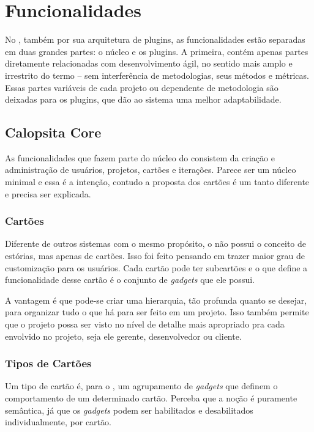 \section{Funcionalidades}

No \calopsita, também por sua arquitetura de plugins, as funcionalidades estão separadas em duas grandes partes: o núcleo e os plugins. A primeira, contém apenas partes diretamente relacionadas com desenvolvimento ágil, no sentido mais amplo e irrestrito do termo -- sem interferência de metodologias, seus métodos e métricas. Essas partes variáveis de cada projeto ou dependente de metodologia são deixadas para os plugins, que dão ao sistema uma melhor adaptabilidade.

\subsection{Calopsita Core}

As funcionalidades que fazem parte do núcleo do \calopsita consistem da criação e administração de usuários, projetos, cartões e iterações. Parece ser um núcleo minimal e essa é a intenção, contudo a proposta dos cartões é um tanto diferente e precisa ser explicada.

\subsubsection*{Cartões}

Diferente de outros sistemas com o mesmo propósito, o \calopsita não possui o conceito de estórias, mas apenas de cartões. Isso foi feito pensando em trazer maior grau de customização para os usuários. Cada cartão pode ter subcartões e o que define a funcionalidade desse cartão é o conjunto de \textit{gadgets} que ele possui. 

A vantagem é que pode-se criar uma hierarquia, tão profunda quanto se desejar, para organizar tudo o que há para ser feito em um projeto. Isso também permite que o projeto possa ser visto no nível de detalhe mais apropriado pra cada envolvido no projeto, seja ele gerente, desenvolvedor ou cliente. 

\subsubsection*{Tipos de Cartões}

Um tipo de cartão é, para o \calopsita, um agrupamento de \textit{gadgets} que definem o comportamento de um determinado cartão. Perceba que a noção é puramente semântica, já que os \textit{gadgets} podem ser habilitados e desabilitados individualmente, por cartão.


